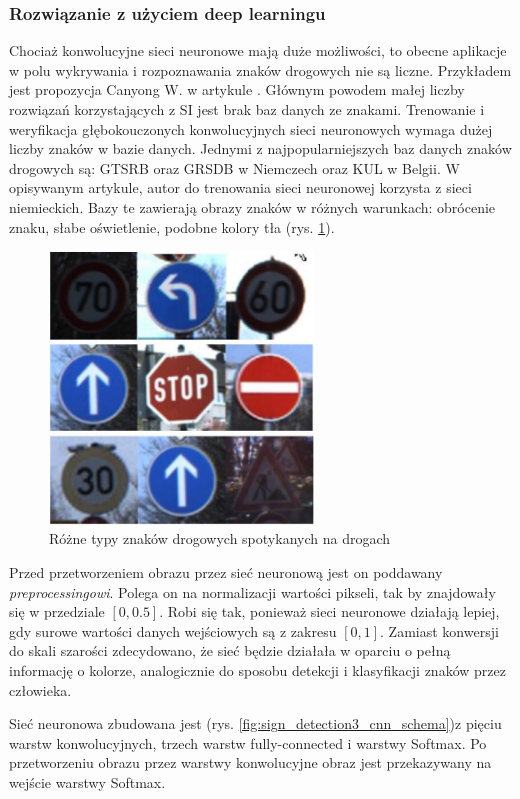 \subsubsection{Rozwiązanie z użyciem deep learningu}
Chociaż konwolucyjne sieci neuronowe mają duże możliwości, to obecne aplikacje w polu wykrywania i rozpoznawania znaków drogowych nie są liczne. Przykładem jest propozycja Canyong W. w artykule \cite{T8}. Głównym powodem małej liczby rozwiązań korzystających z SI jest brak baz danych ze znakami. Trenowanie i weryfikacja głębokouczonych konwolucyjnych sieci neuronowych wymaga dużej liczby znaków w bazie danych.
Jednymi z najpopularniejszych baz danych znaków drogowych są: GTSRB oraz GRSDB w Niemczech oraz KUL w Belgii. W opisywanym artykule, autor do trenowania sieci neuronowej korzysta z sieci niemieckich. Bazy te zawierają obrazy znaków w różnych warunkach: obrócenie znaku, słabe oświetlenie, podobne kolory tła (rys. \ref{fig:sign_detection3_cnn_input}). 

\begin{figure}
  \centering
  \includegraphics[width=7cm]{img/sign_detection3_cnn_input.png}
  \caption{Różne typy znaków drogowych spotykanych na drogach\cite{T8}}
  \label{fig:sign_detection3_cnn_input}
\end{figure}

Przed przetworzeniem obrazu przez sieć neuronową jest on poddawany \textit{preprocessingowi}. Polega on na normalizacji wartości pikseli, tak by znajdowały się w przedziale $[0, 0.5]$. Robi się tak, ponieważ sieci neuronowe działają lepiej, gdy surowe wartości danych wejściowych są z zakresu $[0, 1]$. 
Zamiast konwersji do skali szarości zdecydowano, że sieć będzie działała w oparciu o pełną informację o kolorze, analogicznie do sposobu detekcji i klasyfikacji znaków przez człowieka.

Sieć neuronowa zbudowana jest (rys. \ref{fig:sign_detection3_cnn_schema})z pięciu warstw konwolucyjnych, trzech warstw fully-connected i warstwy Softmax. Po przetworzeniu obrazu przez warstwy konwolucyjne obraz jest przekazywany na wejście warstwy Softmax.

